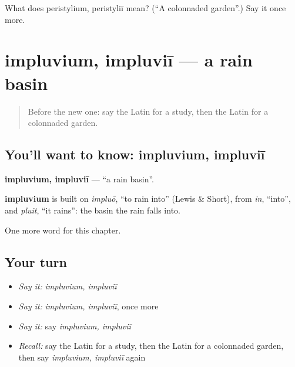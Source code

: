 \begin{tcolorbox}[breakable,colback=teal!4,colframe=teal!35!black,title={Before you move on}]
What does peristylium, peristyliī mean? (\textquotedblleft{}A colonnaded garden\textquotedblright{}.) Say it once more.
\end{tcolorbox}
\section[impluvium, impluviī]{impluvium, impluviī — a rain basin}

\label{lesson:LA-C185-impluvium}



\begin{quote}
Before the new one: say the Latin for a study, then the Latin for a colonnaded garden.
\end{quote}

\subsection*{You'll want to know: impluvium, impluviī}
\textbf{impluvium, impluviī} — \textquotedblleft{}a rain basin\textquotedblright{}.

\begin{cousinweb}
\textbf{impluvium} is built on \emph{impluō}, \textquotedblleft{}to rain into\textquotedblright{} (Lewis \& Short), from \emph{in}, \textquotedblleft{}into\textquotedblright{}, and \emph{pluit}, \textquotedblleft{}it rains\textquotedblright{}: the basin the rain falls into.
\end{cousinweb}

\begin{grammarlens}[title={What you've built}]
One more word for this chapter.
\end{grammarlens}

\subsection*{Your turn}
\begin{itemize}
\raggedright
  \item \emph{Say it:} \emph{impluvium, impluviī}
  \item \emph{Say it:} \emph{impluvium, impluviī}, once more
  \item \emph{Say it:} say \emph{impluvium, impluviī}
  \item \emph{Recall:} say the Latin for a study, then the Latin for a colonnaded garden, then say \emph{impluvium, impluviī} again
\end{itemize}

